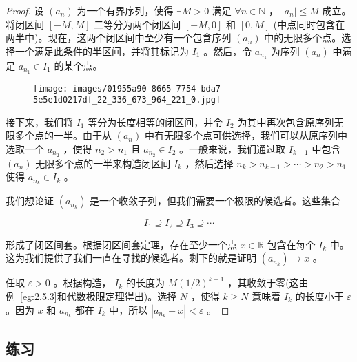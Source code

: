 \begin{proof}
设 \(\left( {a}_{n}\right)\) 为一个有界序列，使得 \(\exists M > 0\) 满足 \(\forall n \in  \mathbb{N}\) ， \(\left| {a}_{n}\right|  \leq  M\) 成立。将闭区间 \(\left\lbrack  {-M,M}\right\rbrack\) 二等分为两个闭区间 \(\left\lbrack  {-M,0}\right\rbrack\) 和 \(\left\lbrack  {0,M}\right\rbrack\) (中点同时包含在两半中)。现在，这两个闭区间中至少有一个包含序列 \(\left( {a}_{n}\right)\) 中的无限多个点。选择一个满足此条件的半区间，并将其标记为 \({I}_{1}\) 。然后，令 \({a}_{{n}_{1}}\) 为序列 \(\left( {a}_{n}\right)\) 中满足 \({a}_{{n}_{1}} \in  {I}_{1}\) 的某个点。

\begin{figure}[h]
  \centering
  \texttt{[image: images/01955a90-8665-7754-bda7-5e5e1d0217df\_22\_336\_673\_964\_221\_0.jpg]}
\end{figure}



接下来，我们将 \({I}_{1}\) 等分为长度相等的闭区间，并令 \({I}_{2}\) 为其中再次包含原序列无限多个点的一半。由于从 \(\left( {a}_{n}\right)\) 中有无限多个点可供选择，我们可以从原序列中选取一个 \({a}_{{n}_{2}}\) ，使得 \({n}_{2} > {n}_{1}\) 且 \({a}_{{n}_{2}} \in  {I}_{2}\) 。一般来说，我们通过取 \({I}_{k - 1}\) 中包含 \(\left( {a}_{n}\right)\) 无限多个点的一半来构造闭区间 \({I}_{k}\) ，然后选择 \({n}_{k} > {n}_{k - 1} > \cdots  > {n}_{2} > {n}_{1}\) 使得 \({a}_{{n}_{k}} \in  {I}_{k}\) 。

我们想论证 \(\left( {a}_{{n}_{k}}\right)\) 是一个收敛子列，但我们需要一个极限的候选者。这些集合

\[
{I}_{1} \supseteq  {I}_{2} \supseteq  {I}_{3} \supseteq  \cdots
\]

形成了闭区间套。根据闭区间套定理，存在至少一个点 \(x \in  \mathbb{R}\) 包含在每个 \({I}_{k}\) 中。这为我们提供了我们一直在寻找的候选者。剩下的就是证明 \(\left( {a}_{{n}_{k}}\right)  \rightarrow  x\) 。

任取 \(\varepsilon  > 0\) 。根据构造， \({I}_{k}\) 的长度为 \(M{\left( 1/2\right) }^{k - 1}\) ，其收敛于零(这由例~\ref{eg:2.5.3}和代数极限定理得出)。选择 \(N\) ，使得 \(k \geq  N\) 意味着 \({I}_{k}\) 的长度小于 \(\varepsilon\) 。因为 \(x\) 和 \({a}_{{n}_{k}}\) 都在 \({I}_{k}\) 中，所以 \(\left| {{a}_{{n}_{k}} - x}\right|  < \varepsilon\) 。
\end{proof}

\subsection{练习}

